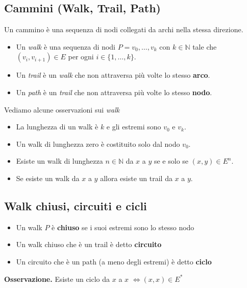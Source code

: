 \documentclass{article}
\begin{document}
\subsection{Cammini (Walk, Trail, Path)}
Un cammino è una sequenza di nodi collegati da archi nella stessa direzione.
\begin{itemize}
    \item Un \emph{walk} è una sequenza di nodi \(P = v_0, \ldots, v_k\) con \(k \in \mathbb{N}\) tale che \((v_i,v_{i+1}) \in E\) per ogni \(i \in \{1,\ldots,k\}\).
    \item Un \emph{trail} è un \emph{walk} che non attraversa più volte lo stesso \textbf{arco}.
    \item Un \emph{path} è un \emph{trail} che non attraversa più volte lo stesso \textbf{nodo}.
\end{itemize}
Vediamo alcune osservazioni sui \emph{walk}
\begin{itemize}
    \item La lunghezza di un walk è \(k\) e gli estremi sono \(v_0\) e \(v_k\).
    \item Un walk di lunghezza zero è costituito solo dal nodo \(v_0\).
    \item Esiste un walk di lunghezza \(n \in \mathbb{N}\) da \(x\) a \(y\) se e solo se \((x,y) \in E^n\).
    \item Se esiste un walk da \(x\) a \(y\) allora esiste un trail da \(x\) a \(y\).
\end{itemize}
\subsection*{Walk chiusi, circuiti e cicli}
\begin{itemize}
    \item Un walk \(P\) è \textbf{chiuso} se i suoi estremi sono lo stesso nodo
    \item Un walk chiuso che è un trail è detto \textbf{circuito}
    \item Un circuito che è un path (a meno degli estremi) è detto \textbf{ciclo}
\end{itemize}
\textbf{Osservazione. } Esiste un ciclo da \(x\) a \(x\) \(\iff (x,x) \in E^*\)
\end{document}
